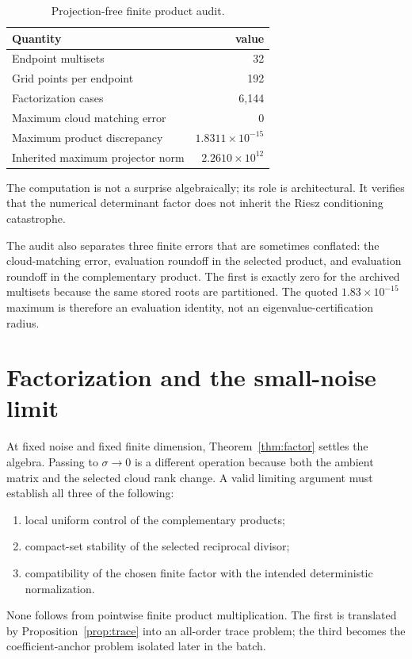 \documentclass[11pt]{article}
\theoremstyle{remark}
\begin{document}
\begin{table}[ht]
\centering
\small
\begin{tabular}{lr}
\toprule
Quantity & value\\
\midrule
Endpoint multisets & 32\\
Grid points per endpoint & 192\\
Factorization cases & 6,144\\
Maximum cloud matching error & $0$\\
Maximum product discrepancy & $1.8311\times10^{-15}$\\
Inherited maximum projector norm & $2.2610\times10^{12}$\\
\bottomrule
\end{tabular}
\caption{Projection-free finite product audit.}
\end{table}

The computation is not a surprise algebraically; its role is architectural.
It verifies that the numerical determinant factor does not inherit the Riesz
conditioning catastrophe.

The audit also separates three finite errors that are sometimes conflated:
the cloud-matching error, evaluation roundoff in the selected product, and
evaluation roundoff in the complementary product.  The first is exactly zero
for the archived multisets because the same stored roots are partitioned.
The quoted $1.83\times10^{-15}$ maximum is therefore an evaluation identity,
not an eigenvalue-certification radius.

\section{Factorization and the small-noise limit}

At fixed noise and fixed finite dimension, Theorem~\ref{thm:factor} settles
the algebra.  Passing to $\sigma\to0$ is a different operation because both
the ambient matrix and the selected cloud rank change.  A valid limiting
argument must establish all three of the following:
\begin{enumerate}[leftmargin=2em]
\item local uniform control of the complementary products;
\item compact-set stability of the selected reciprocal divisor;
\item compatibility of the chosen finite factor with the intended
deterministic normalization.
\end{enumerate}
None follows from pointwise finite product multiplication.  The first is
translated by Proposition~\ref{prop:trace} into an all-order trace problem;
the third becomes the coefficient-anchor problem isolated later in the
batch.
\end{document}
